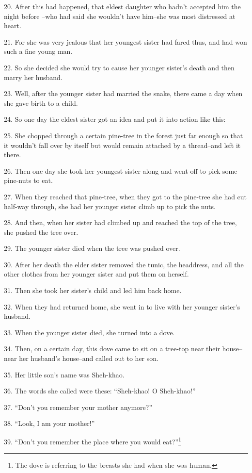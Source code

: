 20. After this had happened, that eldest daughter who hadn't accepted him the night
before --who had said she wouldn't have him--she was most distressed at heart.

21. For she was very jealous that her youngest sister had fared thus, and had won
such a fine young man.

22. So she decided she would try to cause her younger sister's death and then marry
her husband.

23. Well, after the younger sister had married the snake, there came a day when
she gave birth to a child.

24. So one day the eldest sister got an idea and put it into action like this:

25. She chopped through a certain pine-tree in the forest just far enough so that
it wouldn't fall over by itself but would remain attached by a thread--and left
it there.

26. Then one day she took her youngest sister along and went off to pick some pine-nuts
to eat.

27. When they reached that pine-tree, when they got to the pine-tree she had cut
half-way through, she had her younger sister climb up to pick the nuts.

28. And then, when her sister had climbed up and reached the top of the tree, she
pushed the tree over.

29. The younger sister died when the tree was pushed over.

30. After her death the elder sister removed the tunic, the headdress, and all
the other clothes from her younger sister and put them on herself.

31. Then she took her sister's child and led him back home.

32. When they had returned home, she went in to live with her younger sister's
husband.

33. When the younger sister died, she turned into a dove.

34. Then, on a certain day, this dove came to sit on a tree-top near their house--near
her husband's house--and called out to her son.

35. Her little son's name was Sheh-khao.

36. The words she called were these: ``Sheh-khao! O Sheh-khao!''

37. ``Don't you remember your mother anymore?''

38. ``Look, I am your mother!''

39. ``Don't you remember the place where you would eat?''\footnote{The dove is referring to the breasts she had when she was human.}

